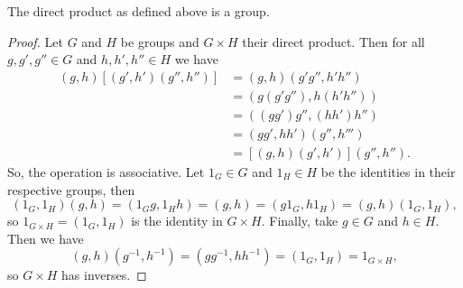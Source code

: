 \documentclass[fleqn]{NotesClass}
\begin{document}
    \begin{lma}{}{}
        The direct product as defined above is a group.
        \begin{proof}
            Let \(G\) and \(H\) be groups and \(G \times H\) their direct product.
            Then for all \(g, g', g'' \in G\) and \(h, h', h'' \in H\) we have
            \begin{align}
                (g, h)[(g', h')(g'', h'')] &= (g, h)(g'g'', h'h'')\\
                &= (g(g'g''), h(h'h''))\\
                &= ((gg')g'', (hh')h'')\\
                &= (gg', hh')(g'', h''')\\
                &= [(g, h)(g', h')](g'', h'').
            \end{align}
            So, the operation is associative.
            Let \(1_G \in G\) and \(1_H \in H\) be the identities in their respective groups, then
            \begin{equation}
                (1_G, 1_H)(g, h) = (1_Gg, 1_Hh) = (g, h) = (g1_G, h1_H) = (g, h)(1_G, 1_H),
            \end{equation}
            so \(1_{G\times H} = (1_G, 1_H)\) is the identity in \(G \times H\).
            Finally, take \(g \in G\) and \(h \in H\).
            Then we have
            \begin{equation}
                (g, h)(g^{-1}, h^{-1}) = (gg^{-1}, hh^{-1}) = (1_G, 1_H) = 1_{G\times H},
            \end{equation}
            so \(G \times H\) has inverses.
        \end{proof}
    \end{lma}
    
\end{document}
